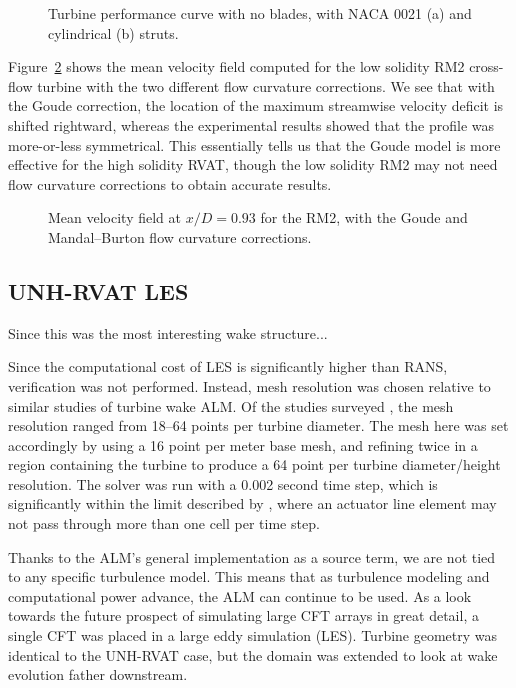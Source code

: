 \begin{figure}
    \caption{Turbine performance curve with no blades, with NACA 0021 (a) and
        cylindrical (b) struts.}
    
    \label{fig:RM2-ALM-strut-perf}
\end{figure}

Figure~\ref{fig:RM2-ALM-flow-curvature} shows the mean velocity field computed
for the low solidity RM2 cross-flow turbine with the two different flow
curvature corrections. We see that with the Goude correction, the location of
the maximum streamwise velocity deficit is shifted rightward, whereas the
experimental results showed that the profile was more-or-less symmetrical. This
essentially tells us that the Goude model is more effective for the high
solidity RVAT, though the low solidity RM2 may not need flow curvature
corrections to obtain accurate results.

\begin{figure}
    \caption{Mean velocity field at $x/D=0.93$ for the RM2, with the Goude and
        Mandal--Burton flow curvature corrections.}
    
    \label{fig:RM2-ALM-flow-curvature}
\end{figure}


\subsection{UNH-RVAT LES}

Since this was the most interesting wake structure...

Since the computational cost of LES is significantly higher than RANS,
verification was not performed. Instead, mesh resolution was chosen relative to
similar studies of turbine wake ALM. Of the studies surveyed
\cite{Shamsoddin2014,Archer2013,Martinez-Tossas2015a,Troldborg2007}, the mesh
resolution ranged from 18--64 points per turbine diameter. The mesh here was set
accordingly by using a 16 point per meter base mesh, and refining twice in a
region containing the turbine to produce a 64 point per turbine diameter/height
resolution. The solver was run with a 0.002 second time step, which is
significantly within the limit described by \cite{Martinez-Tossas2015}, where an
actuator line element may not pass through more than one cell per time step.

Thanks to the ALM's general implementation as a source term, we are not tied to
any specific turbulence model. This means that as turbulence modeling and
computational power advance, the ALM can continue to be used. As a look towards
the future prospect of simulating large CFT arrays in great detail, a single CFT
was placed in a large eddy simulation (LES). Turbine geometry was identical to
the UNH-RVAT case, but the domain was extended to look at wake evolution father
downstream.

